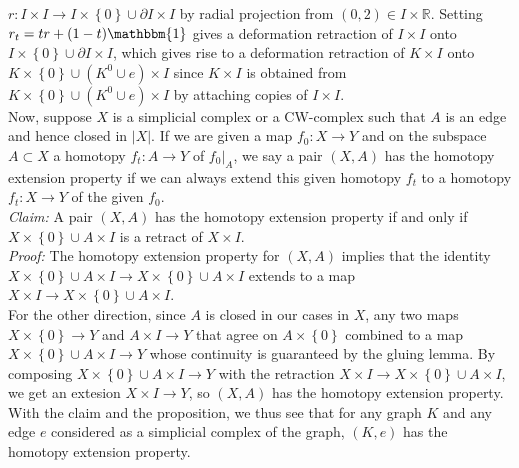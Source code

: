 \documentclass[a4paper]{article}
\begin{document}
    $r  \colon I \times I \to I \times \left\{ 0 \right\} 
    \cup  \partial I \times I$ by radial projection from
    $(0,2) \in I \times \mathbb{R}$. Setting
    $r_t = tr + (1-t) \mathbbm{1}$ gives a deformation retraction of
    $I \times I$ onto $I \times \left\{ 0 \right\} 
    \cup \partial I \times I$, which gives rise to a deformation retraction
    of $K \times I$ onto
    $K \times \left\{ 0 \right\} \cup 
    \left( K^{0}\cup e \right) \times I$ since
    $K \times I$ is obtained from
    $K \times \left\{ 0 \right\} \cup 
    \left( K^{0} \cup e \right) \times I$ by attaching copies of
    $I \times I$.\\
    \linebreak
    Now, suppose $X$ is a simplicial complex or a CW-complex such that
    $A$ is an edge and hence closed in $\left| X \right| $. 
    If we are given a map
    $f_0  \colon X \to Y$ and on the subspace
    $A \subset X$ a homotopy $f_t  \colon A \to Y$ of
    $f_0 |_A$, we say a pair $(X,A)$ has the homotopy extension property if
    we can always extend this given homotopy $f_t$ to a homotopy
    $f_t  \colon X \to Y$ of the given $f_0$.\\
    \textit{Claim:} A pair $(X,A)$ has the homotopy extension property if and
    only if $X \times \left\{ 0 \right\} \cup 
    A \times I$ is a retract of $X \times I$.\\
    \textit{Proof:} The homotopy extension property for
    $(X,A)$ implies that the identity
    $X \times \left\{ 0 \right\} \cup  A \times I
    \to X \times \left\{ 0 \right\} \cup A \times I$ extends to a map
    $X \times I \to X \times \left\{ 0 \right\} 
    \cup  A \times I$.\\
    For the other direction, since $A$ is closed in our cases
    in $X$, any two maps
    $X \times \left\{ 0 \right\} \to Y$ and
    $A \times I \to Y$ that agree on
    $A \times \left\{ 0 \right\} $ combined to a map
    $X \times \left\{ 0 \right\} \cup A \times I \to Y$ whose continuity is
    guaranteed by the gluing lemma. By composing
    $X \times \left\{ 0 \right\} \cup A \times I \to Y$ with the retraction
    $X \times I \to X \times \left\{ 0 \right\} \cup 
    A \times I$, we get an extesion $X \times I \to Y$, so
    $(X,A)$ has the homotopy extension property.\\
    \linebreak
    With the claim and the proposition, we thus see that
    for any graph $K$ and any edge $e$ considered as a simplicial complex
    of the graph,
    $(K, e)$ has the homotopy extension property.\\
\end{document}
